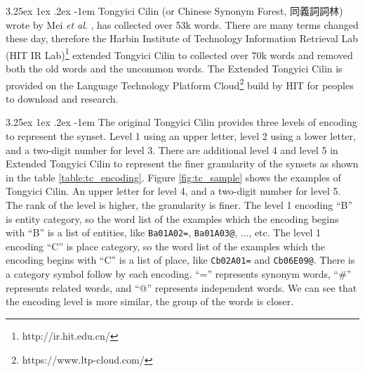 \documentclass[12pt]{article}
\makeatletter
\renewcommand\paragraph{\@startsection{paragraph}{5}{\z@}%
  {3.25ex \@plus1ex \@minus.2ex}%
  {-1em}%
  {\normalfont\normalsize\bfseries}}
\makeatother
\begin{document}
\begin{CJK*}{UTF8}{bkai}
\begin{spacing}{1.77}
\paragraph{}
Tongyici Cilin (or Chinese Synonym Forest, 同義詞詞林) wrote by Mei \emph{et al}. \cite{mei1983hit}, has collected over 53k words. There are many terms changed these day, therefore the Harbin Institute of Technology Information Retrieval Lab (HIT IR Lab)\footnote{http://ir.hit.edu.cn/} extended Tongyici Cilin to collected over 70k words and removed both the old words and the uncommon words. The Extended Tongyici Cilin is provided on the Language Technology Platform Cloud\footnote{https://www.ltp-cloud.com/} build by HIT for peoples to download and research.

\paragraph{}
The original Tongyici Cilin provides three levels of encoding to represent the synset. Level 1 using an upper letter, level 2 using a lower letter, and a two-digit number for level 3. There are additional level 4 and level 5 in Extended Tongyici Cilin to represent the finer granularity of the synsets as shown in the table \ref{table:tc_encoding}. Figure \ref{fig:tc_sample} shows the examples of Tongyici Cilin. An upper letter for level 4, and a two-digit number for level 5. The rank of the level is higher, the granularity is finer.  The level 1 encoding ``B'' is entity category, so the word list of the examples which the encoding begins with ``B'' is a list of entities, like \texttt{Ba01A02=}, \texttt{Ba01A03@}, ..., etc. The level 1 encoding ``C'' is place category, so the word list of the examples which the encoding begins with ``C'' is a list of place, like \texttt{Cb02A01=} and \texttt{Cb06E09@}.  There is a category symbol follow by each encoding. ``='' represents synonym words, ``\#'' represents related words, and ``@'' represents independent words. We can see that the encoding level is more similar, the group of the words is closer.


\end{spacing}
\end{CJK*}
\end{document}
